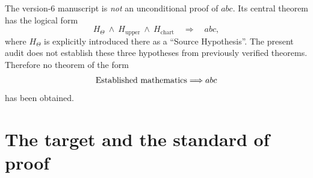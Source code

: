 \documentclass[11pt]{amsart}
\theoremstyle{definition}
\theoremstyle{remark}
\begin{document}
\begin{tcolorbox}[colback=yellow!6,colframe=black!70,title=Main verdict]
The version-6 manuscript is \emph{not} an unconditional proof of $abc$.  Its central theorem has the logical form
\[
  H_{\Theta}\ \wedge\ H_{\mathrm{upper}}\ \wedge\ H_{\mathrm{chart}}
  \quad\Longrightarrow\quad abc,
\]
where $H_{\Theta}$ is explicitly introduced there as a ``Source Hypothesis''.  The present audit does not establish these three hypotheses from previously verified theorems.  Therefore no theorem of the form
\[
  \textnormal{Established mathematics}\Longrightarrow abc
\]
has been obtained.
\end{tcolorbox}

\tableofcontents

\section{The target and the standard of proof}






\end{document}
